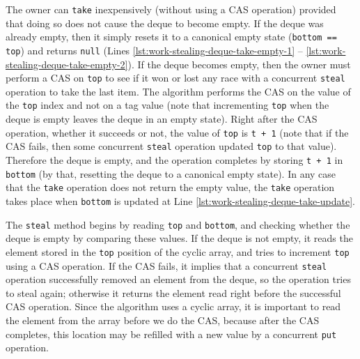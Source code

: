 

The owner can \lstinline!take! inexpensively (without using a CAS
operation) provided that doing so does not cause the deque to become
empty. If the deque was already empty, then it simply resets it to a
canonical empty state (\lstinline!bottom == top!) and returns
\lstinline!null! (Lines \ref{lst:work-stealing-deque-take-empty-1} --
\ref{lst:work-stealing-deque-take-empty-2}). If the deque becomes
empty, then the owner must perform a CAS on \lstinline!top! to see if
it won or lost any race with a concurrent \lstinline!steal!  operation
to take the last item. The algorithm performs the CAS on the value of
the \lstinline!top! index and not on a tag value (note that
incrementing \lstinline!top!  when the deque is empty leaves the deque
in an empty state). Right after the CAS operation, whether it succeeds
or not, the value of \lstinline!top! is \lstinline!t + 1! (note that
if the CAS fails, then some concurrent \lstinline!steal!  operation
updated \lstinline!top! to that value). Therefore the deque is empty,
and the operation completes by storing \lstinline!t + 1! in
\lstinline!bottom!  (by that, resetting the deque to a canonical empty
state). In any case that the \lstinline!take!  operation does not
return the empty value, the \lstinline!take! operation takes place
when \lstinline!bottom! is updated at Line
\ref{lst:work-stealing-deque-take-update}.



The \lstinline!steal! method begins by reading \lstinline!top! and
\lstinline!bottom!, and checking whether the deque is empty by
comparing these values. If the deque is not empty, it reads the
element stored in the \lstinline!top! position of the cyclic array,
and tries to increment \lstinline!top! using a CAS operation. If the
CAS fails, it implies that a concurrent \lstinline!steal! operation
successfully removed an element from the deque, so the operation tries
to steal again; otherwise it returns the element read right before the
successful CAS operation. Since the algorithm uses a cyclic array, it
is important to read the element from the array before we do the CAS,
because after the CAS completes, this location may be refilled with a
new value by a concurrent \lstinline!put!  operation.

